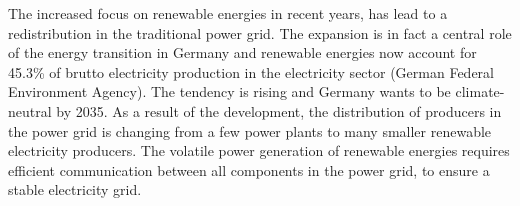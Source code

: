 The increased focus on renewable energies in recent years, has lead to a redistribution in the traditional power grid. The expansion is in fact a central role of the energy transition in Germany and renewable energies now account for 45.3\% of brutto electricity production in the electricity sector (German Federal Environment Agency). The tendency is rising and Germany wants to be climate-neutral by 2035.
As a result of the development, the distribution of producers in the power grid is changing from a few power plants to many smaller renewable electricity producers. The volatile power generation of renewable energies requires efficient communication between all components in the power grid, to ensure a stable electricity grid. \\
